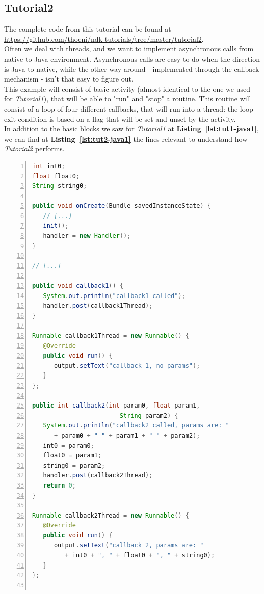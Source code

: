 \documentclass[a4paper,10pt]{article}
\newcommand{\refl}[1]{\textbf{Listing~\ref{#1}}}
\begin{document}
\begin{multicols}{2}
\section{Tutorial2}
\label{sec:tutorial2}
The complete code from this tutorial can be found at \url{https://github.com/thoeni/ndk-tutorials/tree/master/tutorial2}.\\
Often we deal with threads, and we want to implement asynchronous calls from native to Java environment. Asynchronous calls are easy to do when the direction is Java to native, while the other way around - implemented through the callback mechanism - isn't that easy to figure out.\\
This example will consist of basic activity (almost identical to the one we used for \textit{Tutorial1}), that will be able to "run" and "stop" a routine. This routine will consist of a loop of four different callbacks, that will run into a thread: the loop exit condition is based on a flag that will be set and unset by the activity.\\
In addition to the basic blocks we saw for \textit{Tutorial1} at \refl{lst:tut1-java1}, we can find at \refl{lst:tut2-java1} the lines relevant to understand how \textit{Tutorial2} performs.
\begin{lstlisting}[language=Java,
				   columns=fullflexible,
				   showstringspaces=false,
				   xleftmargin=15pt,
				   frame = l,
				   numbers=left,
				   commentstyle=\color{gray}\upshape,
				   caption=Part of Tutorial2Activity.java source code,
				   label=lst:tut2-java1]
int int0;
float float0;
String string0;

public void onCreate(Bundle savedInstanceState) {
   // [...]
   init();
   handler = new Handler();
}

// [...]

public void callback1() {
   System.out.println("callback1 called");
   handler.post(callback1Thread);
}

Runnable callback1Thread = new Runnable() {
   @Override
   public void run() {
      output.setText("callback 1, no params");
   }
};

public int callback2(int param0, float param1,
                        String param2) {
   System.out.println("callback2 called, params are: "
      + param0 + " " + param1 + " " + param2);
   int0 = param0;
   float0 = param1;
   string0 = param2;
   handler.post(callback2Thread);
   return 0;
}

Runnable callback2Thread = new Runnable() {
   @Override
   public void run() {
      output.setText("callback 2, params are: "
         + int0 + ", " + float0 + ", " + string0);
   }
};


\end{lstlisting}
\end{multicols}
\end{document}
